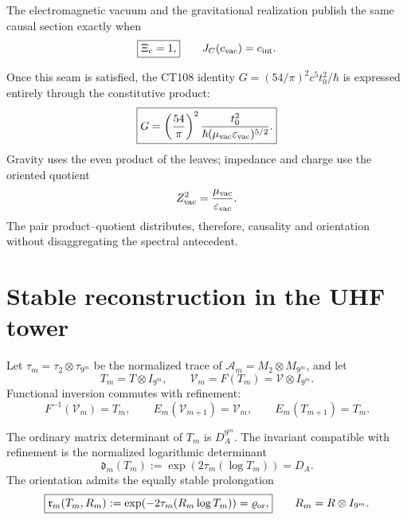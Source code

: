 \begin{criterion}
\label{rm:crit:curve-causal-seam}
The electromagnetic vacuum and the gravitational realization publish the
same causal section exactly when
\begin{equation}
 \boxed{\Xi_c=1,}
 \qquad
 J_C(c_{\rm vac})=c_{\rm int}.
 \label{rm:eq:curve-Xi-one}
\end{equation}
\end{criterion}

Once this seam is satisfied, the CT108 identity
\(
G=(54/\pi)^2c^5t_0^2/\hbar
\)
is expressed entirely through the constitutive product:
\begin{equation}
 \boxed{
 G=\left(\frac{54}{\pi}\right)^2
 \frac{t_0^2}
 {\hbar(\mu_{\rm vac}\varepsilon_{\rm vac})^{5/2}}.}
 \label{rm:eq:curve-G-from-vacuum}
\end{equation}
Gravity uses the even product of the leaves; impedance and charge
use the oriented quotient
\begin{equation}
 Z_{\rm vac}^2=\frac{\mu_{\rm vac}}{\varepsilon_{\rm vac}}.
 \label{rm:eq:curve-Z-oriented}
\end{equation}
The pair product--quotient distributes, therefore, causality and orientation
without disaggregating the spectral antecedent.

\section{Stable reconstruction in the UHF tower}

Let \(\tau_m=\tau_2\otimes\tau_{9^m}\) be the normalized trace of
\(\mathcal A_m=M_2\otimes M_{9^m}\), and let
\begin{equation}
 T_m=T\otimes I_{9^m},
 \qquad
 \mathcal V_m=F(T_m)=\mathcal V\otimes I_{9^m}.
 \label{rm:eq:curve-UHF-TV}
\end{equation}
Functional inversion commutes with refinement:
\begin{equation}
 F^{-1}(\mathcal V_m)=T_m,
 \qquad
 E_m(\mathcal V_{m+1})=\mathcal V_m,
 \qquad
 E_m(T_{m+1})=T_m.
 \label{rm:eq:curve-UHF-inversion}
\end{equation}

The ordinary matrix determinant of \(T_m\) is \(D_A^{9^m}\). The
invariant compatible with refinement is the normalized logarithmic
determinant
\begin{equation}
 \boxed{
 \mathfrak d_m(T_m)
 :=\exp\!\left(2\tau_m(\log T_m)\right)=D_A.}
 \label{rm:eq:curve-normalized-determinant}
\end{equation}
The orientation admits the equally stable prolongation
\begin{equation}
 \boxed{
 \mathfrak r_m(T_m,R_m)
 :=\exp\!\left(-2\tau_m(R_m\log T_m)\right)
 =\varrho_{\rm or},}
 \qquad
 R_m=R\otimes I_{9^m}.
 \label{rm:eq:curve-normalized-orientation}
\end{equation}

